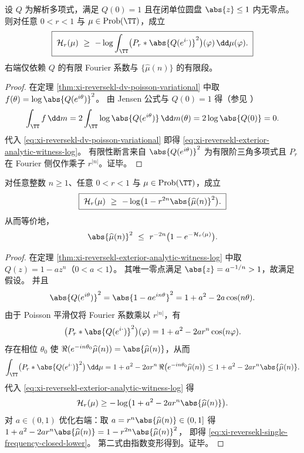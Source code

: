\begin{theorem}[外多项式证人给出的封闭下界]\label{thm:xi-reversekl-exterior-analytic-witness-log}
设 \(Q\) 为解析多项式，满足 \(Q(0)=1\) 且在闭单位圆盘 \(\abs{z}\le 1\) 内无零点。
则对任意 \(0<r<1\) 与 \(\mu\in\mathrm{Prob}(\TT)\)，成立
\begin{equation}\label{eq:xi-reversekl-exterior-analytic-witness-log}
\boxed{\;
\mathcal H_r(\mu)\ \ge\ -\log\int_{\TT}\bigl(P_r*\abs{Q(e^{i\cdot})}^2\bigr)(\varphi)\,\dd\mu(\varphi).
\;}
\end{equation}
右端仅依赖 \(Q\) 的有限 Fourier 系数与 \(\{\widehat\mu(n)\}\) 的有限段。
\end{theorem}
\begin{proof}
在定理 \ref{thm:xi-reversekl-dv-poisson-variational} 中取
\(
f(\theta)=\log\abs{Q(e^{i\theta})}^2
\)。
由 Jensen 公式与 \(Q(0)=1\) 得（参见 \cite{Ahlfors1979ComplexAnalysis}）
\[
\int_{\TT} f\,\dd m=2\int_{\TT}\log\abs{Q(e^{i\theta})}\,\dd m(\theta)=2\log\abs{Q(0)}=0.
\]
代入 \eqref{eq:xi-reversekl-dv-poisson-variational} 即得 \eqref{eq:xi-reversekl-exterior-analytic-witness-log}。
有限性断言来自 \(\abs{Q(e^{i\theta})}^2\) 为有限阶三角多项式且 \(P_r\) 在 Fourier 侧仅作乘子 \(r^{|n|}\)。证毕。
\end{proof}

\begin{corollary}\label{cor:xi-reversekl-single-frequency-closed-lower}
对任意整数 \(n\ge 1\)、任意 \(0<r<1\) 与 \(\mu\in\mathrm{Prob}(\TT)\)，成立
\begin{equation}\label{eq:xi-reversekl-single-frequency-closed-lower}
\boxed{\;
\mathcal H_r(\mu)\ \ge\ -\log\bigl(1-r^{2n}\abs{\widehat\mu(n)}^2\bigr).
\;}
\end{equation}
从而等价地，
\[
\abs{\widehat\mu(n)}^2\ \le\ r^{-2n}\bigl(1-e^{-\mathcal H_r(\mu)}\bigr).
\]
\end{corollary}
\begin{proof}
在定理 \ref{thm:xi-reversekl-exterior-analytic-witness-log} 中取 \(Q(z)=1-a z^n\)（\(0<a<1\)）。
其唯一零点满足 \(\abs{z}=a^{-1/n}>1\)，故满足假设。
并且
\[
\abs{Q(e^{i\theta})}^2=\abs{1-ae^{in\theta}}^2=1+a^2-2a\cos(n\theta).
\]
由于 Poisson 平滑仅将 Fourier 系数乘以 \(r^{|n|}\)，有
\[
\bigl(P_r*\abs{Q(e^{i\cdot})}^2\bigr)(\varphi)=1+a^2-2a r^n\cos(n\varphi).
\]
存在相位 \(\theta_0\) 使 \(\Re(e^{-in\theta_0}\widehat\mu(n))=\abs{\widehat\mu(n)}\)，从而
\[
\int_{\TT}\bigl(P_r*\abs{Q(e^{i\cdot})}^2\bigr)\,\dd\mu
=1+a^2-2a r^n\,\Re\bigl(e^{-in\theta_0}\widehat\mu(n)\bigr)
\le 1+a^2-2a r^n\abs{\widehat\mu(n)}.
\]
代入 \eqref{eq:xi-reversekl-exterior-analytic-witness-log} 得
\[
\mathcal H_r(\mu)\ge -\log\bigl(1+a^2-2a r^n\abs{\widehat\mu(n)}\bigr).
\]
对 \(a\in(0,1)\) 优化右端：取 \(a=r^n\abs{\widehat\mu(n)}\in(0,1]\) 得
\(
1+a^2-2a r^n\abs{\widehat\mu(n)}=1-r^{2n}\abs{\widehat\mu(n)}^2
\)，
即得 \eqref{eq:xi-reversekl-single-frequency-closed-lower}。
第二式由指数变形得到。证毕。
\end{proof}

